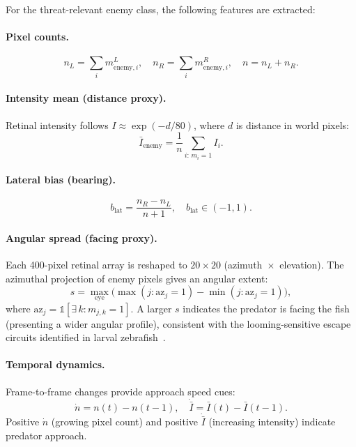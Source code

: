 \documentclass[11pt,a4paper]{article}
\begin{document}
For the threat-relevant enemy class, the following features are extracted:

\paragraph{Pixel counts.}
\begin{equation}\label{eq:enemy_px}
  n_L = \sum_i m_{\text{enemy},i}^L, \quad
  n_R = \sum_i m_{\text{enemy},i}^R, \quad
  n = n_L + n_R.
\end{equation}

\paragraph{Intensity mean (distance proxy).}
Retinal intensity follows $I \approx \exp(-d/80)$, where $d$ is
distance in world pixels:
\begin{equation}\label{eq:enemy_intensity}
  \bar{I}_\text{enemy} = \frac{1}{n}\sum_{i:\, m_i=1} I_i.
\end{equation}

\paragraph{Lateral bias (bearing).}
\begin{equation}\label{eq:lateral_bias}
  b_\text{lat} = \frac{n_R - n_L}{n + 1},
  \quad b_\text{lat} \in (-1, 1).
\end{equation}

\paragraph{Angular spread (facing proxy).}
Each 400-pixel retinal array is reshaped to $20 \times 20$
(azimuth~$\times$~elevation).
The azimuthal projection of enemy pixels gives an angular extent:
\begin{equation}\label{eq:angular_spread}
  s = \max_{\text{eye}} \bigl(\max(j : \text{az}_j = 1) - \min(j : \text{az}_j = 1)\bigr),
\end{equation}
where $\text{az}_j = \mathbb{1}[\exists\, k : m_{j,k} = 1]$.
A larger $s$ indicates the predator is facing the fish (presenting a wider
angular profile), consistent with the looming-sensitive escape circuits
identified in larval zebrafish~\cite{temizer2015,dunn2016}.

\paragraph{Temporal dynamics.}
Frame-to-frame changes provide approach speed cues:
\begin{equation}\label{eq:temporal}
  \dot{n} = n(t) - n(t{-}1), \quad
  \dot{\bar{I}} = \bar{I}(t) - \bar{I}(t{-}1).
\end{equation}
Positive $\dot{n}$ (growing pixel count) and positive $\dot{\bar{I}}$
(increasing intensity) indicate predator approach.
\end{document}
